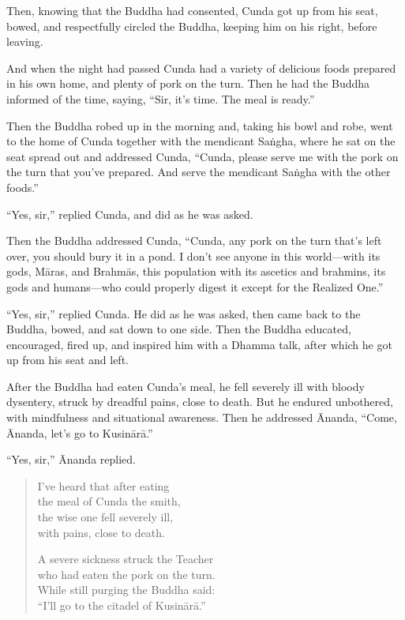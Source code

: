 \documentclass[12pt,openany]{book}%
\begin{document}
Then, knowing that the Buddha had consented, Cunda got up from his seat, bowed, and respectfully circled the Buddha, keeping him on his right, before leaving. 

And when the night had passed Cunda had a variety of delicious foods prepared in his own home, and plenty of pork on the turn. Then he had the Buddha informed of the time, saying, “Sir, it’s time. The meal is ready.” 

Then the Buddha robed up in the morning and, taking his bowl and robe, went to the home of Cunda together with the mendicant \textsanskrit{Saṅgha}, where he sat on the seat spread out and addressed Cunda, “Cunda, please serve me with the pork on the turn that you’ve prepared. And serve the mendicant \textsanskrit{Saṅgha} with the other foods.” 

“Yes, sir,” replied Cunda, and did as he was asked. 

Then the Buddha addressed Cunda, “Cunda, any pork on the turn that’s left over, you should bury it in a pond. I don’t see anyone in this world—with its gods, \textsanskrit{Māras}, and \textsanskrit{Brahmās}, this population with its ascetics and brahmins, its gods and humans—who could properly digest it except for the Realized One.” 

“Yes, sir,” replied Cunda. He did as he was asked, then came back to the Buddha, bowed, and sat down to one side. Then the Buddha educated, encouraged, fired up, and inspired him with a Dhamma talk, after which he got up from his seat and left. 

After the Buddha had eaten Cunda’s meal, he fell severely ill with bloody dysentery, struck by dreadful pains, close to death. But he endured unbothered, with mindfulness and situational awareness. Then he addressed Ānanda, “Come, Ānanda, let’s go to \textsanskrit{Kusinārā}.” 

“Yes, sir,” Ānanda replied. 

\begin{verse}%
I’ve heard that after eating \\
the meal of Cunda the smith, \\
the wise one fell severely ill, \\
with pains, close to death. 

A severe sickness struck the Teacher \\
who had eaten the pork on the turn. \\
While still purging the Buddha said: \\
“I’ll go to the citadel of \textsanskrit{Kusinārā}.” 

%
\end{verse}
\end{document}
